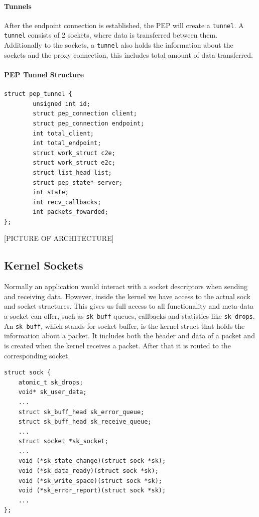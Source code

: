 \documentclass[a4paper,english, 11pt]{report}
\begin{document}
\paragraph{Tunnels}
After the endpoint connection is established, the PEP will create a \verb|tunnel|. A \verb|tunnel| consists of 2 sockets, where data is transferred between them. Additionally to the sockets, a \verb|tunnel| also holds the information about the sockets and the proxy connection, this includes total amount of data transferred.\\

\noindent\begin{minipage}{\linewidth}
\paragraph{PEP Tunnel Structure}
\begin{verbatim}
struct pep_tunnel {
        unsigned int id;
        struct pep_connection client;
        struct pep_connection endpoint;
        int total_client;
        int total_endpoint;
        struct work_struct c2e;
        struct work_struct e2c;
        struct list_head list;
        struct pep_state* server;
        int state;
        int recv_callbacks;
        int packets_fowarded;
};
\end{verbatim}
\end{minipage}

[PICTURE OF ARCHITECTURE]\\

\subsection{Kernel Sockets}
Normally an application would interact with a socket descriptors when sending and receiving data. However, inside the kernel we have access to the actual sock and socket structures. This gives us full access to all functionality and meta-data a socket can offer, such as \verb|sk_buff| queues, callbacks and statistics like \verb|sk_drops|. An \verb|sk_buff|, which stands for socket buffer, is the kernel struct that holds the information about a packet. It includes both the header and data of a packet and is created when the kernel receives a packet. After that it is routed to the corresponding socket.\\

\noindent\begin{minipage}{\linewidth}
\begin{verbatim}
struct sock {
    atomic_t sk_drops;
    void* sk_user_data;
    ...
    struct sk_buff_head	sk_error_queue;
    struct sk_buff_head	sk_receive_queue;
    ...
    struct socket *sk_socket;
    ...
    void (*sk_state_change)(struct sock *sk);
    void (*sk_data_ready)(struct sock *sk);
    void (*sk_write_space)(struct sock *sk);
    void (*sk_error_report)(struct sock *sk);
    ...
};
\end{verbatim}
\label{fig:kern_sock}
\end{minipage}
\end{document}
